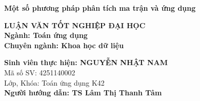 \documentclass[12pt,a4paper,oneside]{report}
\numberwithin{equation}{section}
\begin{document}
\vskip 3cm
\begin{center}
{\bf\fontsize{22pt}{22}\selectfont Một số phương pháp phân tích ma trận và ứng dụng}



\vskip 3.5cm
{\bf\fontsize{16pt}{22}\selectfont LUẬN VĂN TỐT NGHIỆP ĐẠI HỌC}\\
\vskip 0.5cm
{\bf\fontsize{16pt}{22}\selectfont Ngành: Toán ứng dụng}\\
\vskip 0.05cm
{\bf\fontsize{16pt}{22}\selectfont Chuyên ngành: Khoa học dữ liệu}\\
\vskip 2.5cm
\end{center}
\begin{flushleft}
{\bf\fontsize{16pt}{22}\selectfont Sinh viên thực hiện:  NGUYỄN NHẬT NAM}\\
\vskip 0.05cm
{\fontsize{16pt}{22}\selectfont Mã số SV: 4251140002}\\
\vskip 0.05cm
{\fontsize{16pt}{22}\selectfont Lớp, Khóa: Toán ứng dụng K42}\\
\vskip 2cm
{\bf\fontsize{16pt}{22}\selectfont Người hướng dẫn: TS Lâm Thị Thanh Tâm}\\
\end{flushleft}
\end{document}
